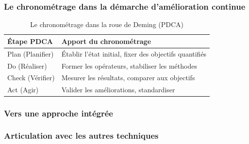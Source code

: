 \documentclass[a4paper,12pt]{article}
\begin{document}
\subsubsection*{Le chronométrage dans la démarche d'amélioration continue}

\begin{table}[ht]
\centering
\begin{tabular}{|p{4cm}|p{10cm}|}
\hline
\textbf{Étape PDCA} & \textbf{Apport du chronométrage} \\
\hline
Plan (Planifier) & Établir l'état initial, fixer des objectifs quantifiés \\
Do (Réaliser) & Former les opérateurs, stabiliser les méthodes \\
Check (Vérifier) & Mesurer les résultats, comparer aux objectifs \\
Act (Agir) & Valider les améliorations, standardiser \\
\hline
\end{tabular}
\caption{Le chronométrage dans la roue de Deming (PDCA)}
\end{table}

\subsubsection*{Vers une approche intégrée}

\begin{center}
\end{center}

\subsubsection*{Articulation avec les autres techniques}
\end{document}
